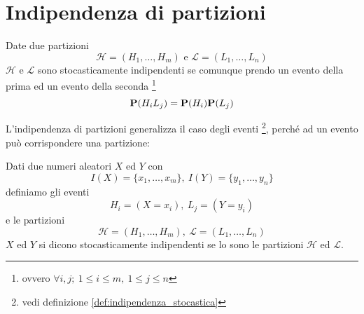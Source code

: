
\section{Indipendenza di partizioni} %
\begin{definition}
  \label{def:indipendenza_di_partizioni}
  Date due partizioni
  \[ \mathcal{H} = (H_1, \ldots, H_m) \text{ e } \mathcal{L} = (L_1, \ldots, L_n) \]
  \( \mathcal{H} \) e \( \mathcal{L} \) sono stocasticamente indipendenti se comunque prendo un evento della prima ed un evento della seconda
  \footnote{ovvero \( \forall i, j; ~ 1 \le i \le m, ~ 1 \le j \le n \)}
  \[ \mathbf{P}(H_i L_j) = \mathbf{P}(H_i) \mathbf{P}(L_j) \]
\end{definition}

L'indipendenza di partizioni generalizza il caso degli eventi
\footnote{vedi definizione \ref{def:indipendenza_stocastica}},
perché ad un evento può corrispondere una partizione:
\begin{definition}
  Dati due numeri aleatori \( X \) ed \( Y \) con
  \[ I(X) = \{ x_1, \ldots, x_m \}, ~ I(Y) = \{ y_1, \ldots, y_n \} \]
  definiamo gli eventi
  \[ H_i = (X = x_i), ~ L_j = (Y = y_i) \]
  e le partizioni
  \[ \mathcal{H} = (H_1, \ldots, H_m), ~ \mathcal{L} = (L_1, \ldots, L_n) \]
  \( X \) ed \( Y \) si dicono stocasticamente indipendenti se lo sono le partizioni \( \mathcal{H} \) ed \( \mathcal{L} \).
\end{definition}
